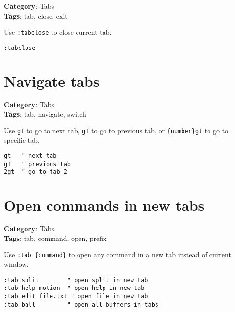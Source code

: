 {{{{{{{{{{{{{{\textbf{Category}: Tabs\\ \textbf{Tags}: tab, close, exit
\vspace{0.5cm}

Use {\footnotesize \Verb§:tabclose§} to close current tab.

\begin{Exa*}{}
\begin{Verbatim}[fontsize=\footnotesize, breaklines, breakanywhere]
:tabclose
\end{Verbatim}
\end{Exa*}

\section{Navigate tabs}

\textbf{Category}: Tabs\\ \textbf{Tags}: tab, navigate, switch
\vspace{0.5cm}

Use {\footnotesize \Verb§gt§} to go to next tab, {\footnotesize \Verb§gT§} to go to previous tab, or {\footnotesize \Verb§{number}gt§} to go to specific tab.

\begin{Exa*}{}
\begin{Verbatim}[fontsize=\footnotesize, breaklines, breakanywhere]
gt   " next tab
gT   " previous tab
2gt  " go to tab 2
\end{Verbatim}
\end{Exa*}

\section{Open commands in new tabs}

\textbf{Category}: Tabs\\ \textbf{Tags}: tab, command, open, prefix
\vspace{0.5cm}

Use {\footnotesize \Verb§:tab {command}§} to open any command in a new tab instead of current window.

\begin{Exa*}{}
\begin{Verbatim}[fontsize=\footnotesize, breaklines, breakanywhere]
:tab split        " open split in new tab
:tab help motion  " open help in new tab
:tab edit file.txt " open file in new tab
:tab ball         " open all buffers in tabs
\end{Verbatim}
\end{Exa*}

}}}}}}}}}}}}}}

